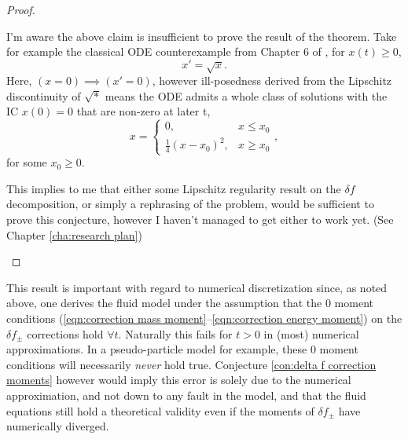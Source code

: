 \begin{proof}
\begin{enumerate}
            \begin{remark}
                I'm aware the above claim is insufficient to prove the result of the theorem. Take for example the classical ODE counterexample from Chapter 6 of \cite{Robinson_2004}, for $x(t)  \geq  0$,
                \begin{equation}
                    x'  =  \sqrt{x}.
                \end{equation}
                Here, $(x = 0)  \implies  (x'  =  0)$, however ill-posedness derived from the Lipschitz discontinuity of $\sqrt{*}$ means the ODE admits a whole class of solutions with the IC $x(0) = 0$ that are non-zero at later t,
                \begin{equation}
                    x  =  \left\{\begin{matrix}
                        0,                           &  x \leq x_{0}  \\ 
                        \frac{1}{4}(x - x_{0})^{2},  &  x \geq x_{0}
                    \end{matrix}\right.,
                \end{equation}
                for some $x_{0}  \geq  0$.
                
                This implies to me that either some Lipschitz regularity result on the $\delta\!f$ decomposition, or simply a rephrasing of the problem, would be sufficient to prove this conjecture, however I haven't managed to get either to work yet. (See Chapter \ref{cha:research plan})
            \end{remark}
        \end{enumerate}
    \end{proof}

    This result is important with regard to numerical discretization since, as noted above, one derives the fluid model under the assumption that the 0 moment conditions (\ref{eqn:correction mass moment}--\ref{eqn:correction energy moment}) on the $\delta\!f_{\pm}$ corrections hold $\forall t$. Naturally this fails for $t > 0$ in (most) numerical approximations. In a pseudo-particle model for example, these 0 moment conditions will necessarily \emph{never} hold true. Conjecture \ref{con:delta f correction moments} however would imply this error is solely due to the numerical approximation, and not down to any fault in the model, and that the fluid equations still hold a theoretical validity even if the moments of $\delta\!f_{\pm}$ have numerically diverged. 

